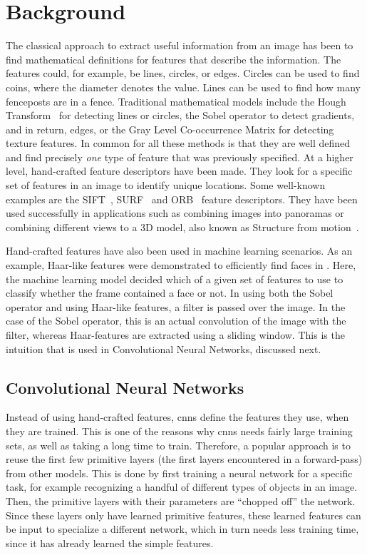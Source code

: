 \chapter{Background}

The classical approach to extract useful information from an image has been to find mathematical definitions for features that describe the information. The features could, for example, be lines, circles, or edges. 
Circles can be used to find coins, where the diameter denotes the value. Lines can be used to find how many fenceposts are in a fence. Traditional mathematical models include the Hough Transform~\cite{houghTransform} for detecting lines or circles, the Sobel operator to detect gradients, and in return, edges, or the Gray Level Co-occurrence Matrix for detecting texture features. 
In common for all these methods is that they are well defined and find precisely \emph{one} type of feature that was previously specified. 
At a higher level, hand-crafted feature descriptors have been made. They look for a specific set of features in an image to identify unique locations. Some well-known examples are the SIFT~\cite{sift1999Lowe}, SURF~\cite{surf2006Bay} and ORB~\cite{orb2011Rublee} feature descriptors. They have been used successfully in applications such as combining images into panoramas or combining different views to a 3D model, also known as Structure from motion~\cite{sfm1979ullman}.

Hand-crafted features have also been used in machine learning scenarios. As an example, Haar-like features were demonstrated to efficiently find faces in \cite{haarcascade}. Here, the machine learning model decided which of a given set of features to use to classify whether the frame contained a face or not. In using both the Sobel operator and using Haar-like features, a filter is passed over the image. In the case of the Sobel operator, this is an actual convolution of the image with the filter, whereas Haar-features are extracted using a sliding window. This is the intuition that is used in Convolutional Neural Networks, discussed next.

\section{Convolutional Neural Networks}
Instead of using hand-crafted features, \gls{cnn}s define the features they use, when they are trained. This is one of the reasons why \gls{cnn}s needs fairly large training sets, as well as taking a long time to train. Therefore, a popular approach is to reuse the first few primitive layers (the first layers encountered in a forward-pass) from other models. This is done by first training a neural network for a specific task, for example recognizing a handful of different types of objects in an image. Then, the primitive layers with their parameters are ``chopped off'' the network. Since these layers only have learned primitive features, these learned features can be input to specialize a different network, which in turn needs less training time, since it has already learned the simple features.

